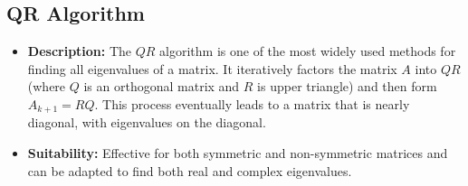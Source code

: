 \documentclass[journal]{IEEEtran}
\begin{document}
\subsection*{\textbf{QR Algorithm}}
\begin{itemize}
    \item \textbf{Description:} The $QR$ algorithm is one of the most widely used methods for finding all eigenvalues of a matrix. It iteratively factors the matrix $A$ into $QR$ (where $Q$ is an orthogonal matrix and $R$ is upper triangle) and then form $A_{k+1} = RQ$. This process eventually leads to a matrix that is nearly diagonal, with eigenvalues on the diagonal.
    \item \textbf{Suitability:} Effective for both symmetric and non-symmetric matrices and can be adapted to find both real and complex eigenvalues.
\end{itemize}
\end{document}
